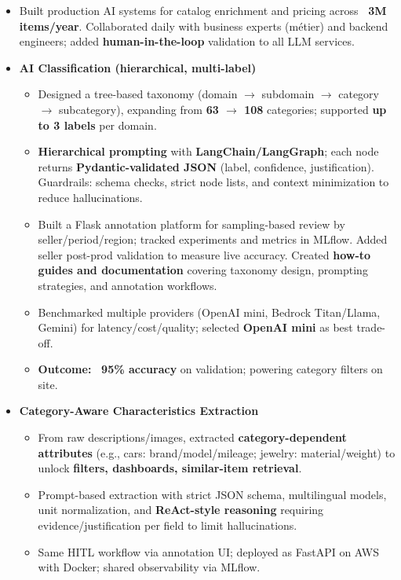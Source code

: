 \documentclass[10pt,a4paper]{altacv}
\begin{document}
\begin{itemize}
  \item Built production AI systems for catalog enrichment and pricing across \textbf{~3M items/year}. Collaborated daily with business experts (m\'etier) and backend engineers; added \textbf{human-in-the-loop} validation to all LLM services.
  \item \textbf{AI Classification (hierarchical, multi-label)}
  \begin{itemize}
    \item Designed a tree-based taxonomy (domain $\rightarrow$ subdomain $\rightarrow$ category $\rightarrow$ subcategory), expanding from \textbf{63 $\rightarrow$ 108} categories; supported \textbf{up to 3 labels} per domain.
    \item \textbf{Hierarchical prompting} with \textbf{LangChain/LangGraph}; each node returns \textbf{Pydantic-validated JSON} (label, confidence, justification). Guardrails: schema checks, strict node lists, and context minimization to reduce hallucinations.
    \item Built a Flask annotation platform for sampling-based review by seller/period/region; tracked experiments and metrics in MLflow. Added seller post-prod validation to measure live accuracy. Created \textbf{how-to guides and documentation} covering taxonomy design, prompting strategies, and annotation workflows.
    \item Benchmarked multiple providers (OpenAI mini, Bedrock Titan/Llama, Gemini) for latency/cost/quality; selected \textbf{OpenAI mini} as best trade-off.
    \item \textbf{Outcome:} \textbf{~95\% accuracy} on validation; powering category filters on site.
  \end{itemize}
  \item \textbf{Category-Aware Characteristics Extraction}
  \begin{itemize}
    \item From raw descriptions/images, extracted \textbf{category-dependent attributes} (e.g., cars: brand/model/mileage; jewelry: material/weight) to unlock \textbf{filters, dashboards, similar-item retrieval}.
    \item Prompt-based extraction with strict JSON schema, multilingual models, unit normalization, and \textbf{ReAct-style reasoning} requiring evidence/justification per field to limit hallucinations.
    \item Same HITL workflow via annotation UI; deployed as FastAPI on AWS with Docker; shared observability via MLflow.

\end{itemize}
\end{itemize}
\end{document}
